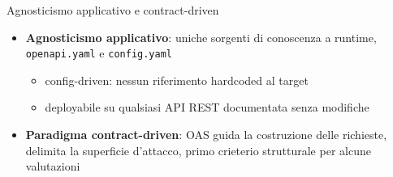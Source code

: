 
\begin{frame}{Agnosticismo applicativo e contract-driven}
  \begin{itemize}
    \item \textbf{Agnosticismo applicativo}: uniche sorgenti di conoscenza a runtime, \alert{\texttt{openapi.yaml}} e \alert{\texttt{config.yaml}}
          \begin{itemize}
            \item \alert{config-driven:} nessun riferimento hardcoded al target
            \item deployabile su \alert{qualsiasi API REST documentata} senza modifiche
          \end{itemize}

    \item \textbf{Paradigma contract-driven}: \alert{OAS} guida la \alert{costruzione} delle richieste, delimita la \alert{superficie d'attacco}, primo \alert{crieterio strutturale} per alcune valutazioni
  \end{itemize}
\end{frame}